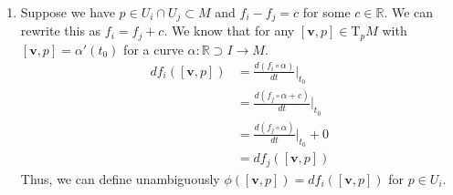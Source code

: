 \documentclass[12 pt, letterpaper]{hmcpset}
\begin{document}
\begin{solution}
	\begin{enumerate}
		\item
			Suppose we have $p \in U_{i} \cap U_{j} \subset M$ and $f_{i} - f_{j} = c$ for some $c \in \mathbb{R}$. We can rewrite this as $f_{i} = f_{j} + c$. We know that for any $[\mathbf{v}, p] \in \mathrm{T}_{p} M$ with $[\mathbf{v}, p] = \alpha'(t_{0})$ for a curve $\alpha : \mathbb{R} \supset I \to M$.
			\[
				\begin{split}
					df_{i}([\mathbf{v}, p]) & = \frac{d (f_{i} \circ \alpha)}{d t} \Big |_{t_{0}} \\
					& = \frac{d (f_{j} \circ \alpha + c)}{d t} \Big |_{t_{0}} \\
					& = \frac{d (f_{j} \circ \alpha)}{d t} \Big |_{t_{0}} + 0 \\
					& = df_{j}([\mathbf{v}, p])
				\end{split}
			\]
			Thus, we can define unambiguously $\phi([\mathbf{v}, p]) = df_{i}([\mathbf{v}, p])$ for $p \in U_{i}$.
	\end{enumerate}
\end{solution}
\end{document}
